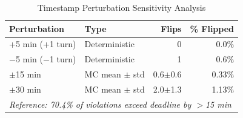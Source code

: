 \begin{table}[t]
\centering
\caption{Timestamp Perturbation Sensitivity Analysis}
\label{tab:timestamp_sensitivity}
\begin{tabular}{llrr}
\toprule
Perturbation & Type & Flips & \% Flipped \\
\midrule
+5 min (+1 turn) & Deterministic & 0 & 0.0\% \\
$-$5 min ($-$1 turn) & Deterministic & 1 & 0.6\% \\
\midrule
$\pm$15 min & MC mean $\pm$ std & 0.6$\pm$0.6 & 0.33\% \\
$\pm$30 min & MC mean $\pm$ std & 2.0$\pm$1.3 & 1.13\% \\
\midrule
\multicolumn{4}{l}{\textit{Reference: 70.4\% of violations exceed deadline by $>$15 min}} \\
\bottomrule
\end{tabular}
\end{table}
